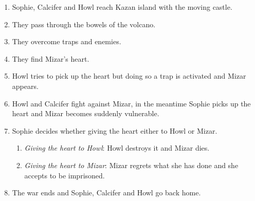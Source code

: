\begin{enumerate}
  \begin{enumerate}
  \item Sophie, Calcifer and Howl reach Kazan island with the moving castle.
    
  \item They pass through the bowels of the volcano.
    
  \item They overcome traps and enemies.
    
  \item They find Mizar's heart.
    
  \item Howl tries to pick up the heart but doing so a trap is activated and Mizar appears.
    
    
  \item Howl and Calcifer fight against Mizar, in the meantime Sophie picks up the heart and Mizar becomes suddenly vulnerable.
    
  \item Sophie decides whether giving the heart either to Howl or Mizar.
    
    \begin{enumerate}
    \item \textit{Giving the heart to Howl}: Howl destroys it and Mizar dies.
      
    \item \textit{Giving the heart to Mizar}: Mizar regrets what she has done and she accepts to be imprisoned.
    \end{enumerate}
    
  \item The war ends and Sophie, Calcifer and Howl go back home.
  \end{enumerate}

\end{enumerate}
